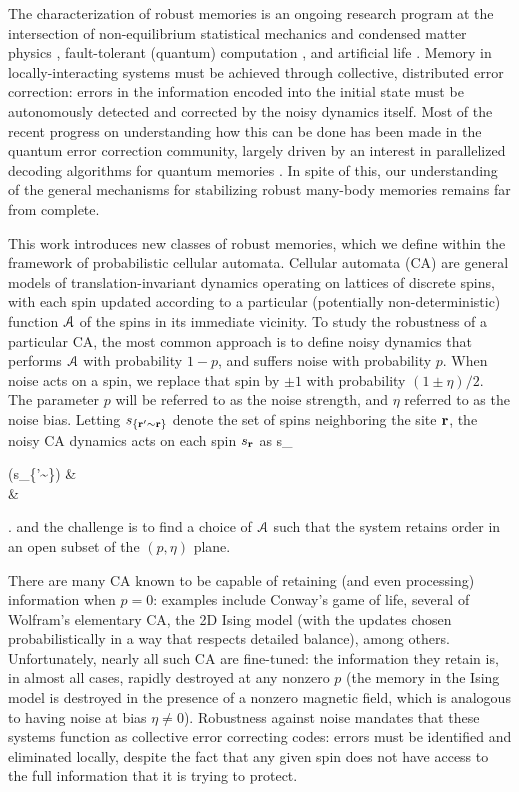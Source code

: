 \documentclass[pra,aps,twocolumn,groupedaddress,superscriptaddress,nofootinbib,preprintnumbers]{revtex4-2}
\begin{document}
	The characterization of robust memories is an ongoing research program at the intersection of non-equilibrium statistical mechanics and condensed matter physics \cite{ponselet2013phase,rakovszky2024defining,sang2024mixed,pajouheshgar2025exploring}, fault-tolerant (quantum) computation \cite{gacs1978one,toom1980stable,cirel2006reliable,gacs2001reliable}, and artificial life \cite{mordvintsev2020growing,challa2024effect,pajouheshgar2024noisenca}. 
	Memory in locally-interacting systems must be achieved through collective, distributed error correction: errors in the information encoded into the initial state must be autonomously detected and corrected by the noisy dynamics itself. Most of the recent progress on understanding how this can be done has been made in the quantum error correction community, largely driven by an interest in parallelized decoding algorithms for quantum memories \cite{Harrington2004,ray2024protecting,balasubramanian2024local, paletta2025high,lake2025fast}. In spite of this, our understanding of the general mechanisms for stabilizing robust many-body memories remains far from complete. 
	
	This work introduces new classes of robust memories, which we define within the framework of probabilistic cellular automata. Cellular automata (CA) are general models of translation-invariant dynamics operating on lattices of discrete spins, with each spin updated according to a particular (potentially non-deterministic) function $\mathcal{A}$ of the spins in its immediate vicinity. To study the robustness of a particular CA, the most common approach is to define noisy dynamics that performs $\mathcal{A}$ with probability $1-p$, and suffers noise with probability $p$. When noise acts on a spin, we replace that spin by $\pm1$ with probability $(1\pm\eta)/2$. The parameter $p$ will be referred to as the noise strength, and $\eta$ referred to as the noise bias. Letting $s_{\{\mathbf{r}'\sim \mathbf{r}\}}$ denote the set of spins neighboring the site $\mathbf{r}$, the noisy CA dynamics acts on each spin $s_{\mathbf{r}}$ as
	\be s_\bfr \mt \begin{dcases} \mca(s_{\{\bfr'\sim \bfr\}}) &  \\ 
		 &  \end{dcases}.\ee 
	and the challenge is to find a choice of $\mathcal{A}$ such that the system retains order in an open subset of the $(p,\eta)$ plane. 
	
	There are many CA known to be capable of retaining (and even processing) information when $p=0$: examples include Conway's game of life, several of Wolfram's elementary CA, the 2D Ising model (with the updates chosen probabilistically in a way that respects detailed balance), among others. 
	Unfortunately, nearly all such CA are fine-tuned: the information they retain is, in almost all cases, rapidly destroyed at any nonzero $p$ (the memory in the Ising model is destroyed in the presence of a nonzero magnetic field, which is analogous to having noise at bias $\eta \neq 0$). Robustness against noise mandates that these systems function as collective error correcting codes: errors must be identified and eliminated locally, despite the fact that any given spin does not have access to the full information that it is trying to protect. 
	
\end{document}
